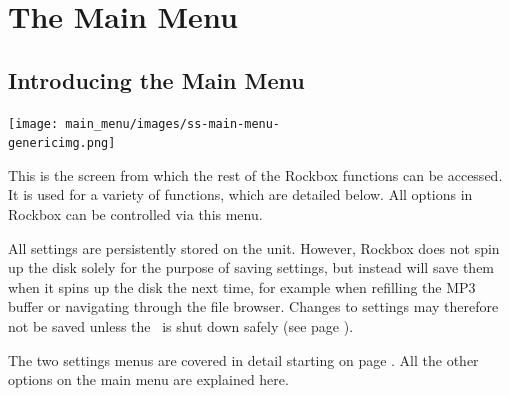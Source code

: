 \chapter{The Main Menu}

\section{Introducing the Main Menu}
\begin{center}
  \texttt{[image: main\_menu/images/ss-main-menu-\\genericimg.png]}
\end{center}
This is the screen from which the rest of the Rockbox functions can be accessed. It is used for a variety of functions, which are detailed below. All options in Rockbox can be controlled via this menu.

All settings are persistently stored on the unit. However, Rockbox does not spin up the disk solely for the purpose of saving settings, but instead will save them when it spins up the disk the next time, for example when refilling the MP3 buffer or navigating through the file browser. Changes to settings may therefore not be saved unless the \dap\ is shut down safely (see page \pageref{ref:Safeshutdown}).

The two settings menus are covered in detail starting on page \pageref{ref:configure_rockbox}. All the other options on the main menu are explained here.

